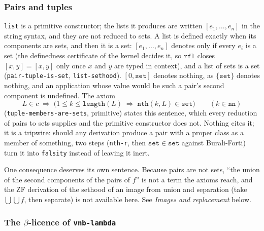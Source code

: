\subsubsection{Pairs and tuples}

\texttt{list} is a primitive constructor; the lists it produces are
written $[e_1, \ldots, e_n]$ in the string syntax, and they are not reduced
to sets.  A list is defined exactly when its components are sets, and
then it is a set: $[e_1, \ldots, e_n]$ denotes only if every $e_i$ is a
set (the definedness certificate of the kernel decides it, so $\texttt{rfl}$
closes $[x, y] = [x, y]$ only once $x$ and $y$ are typed in context), and a
list of sets is a set (\texttt{pair-tuple-is-set}, \texttt{list-sethood}).
$[0, \mathtt{set}]$ denotes nothing, as $\{\mathtt{set}\}$ denotes nothing,
and an application whose value would be such a pair's second component is
undefined.  The axiom
\[
  L \in c \;\Longrightarrow\; \bigl(1 \le k \le \texttt{length}(L)
  \;\Longrightarrow\; \texttt{nth}(k, L) \in \mathtt{set}\bigr)
  \qquad (k \in \mathtt{nn})
\]
(\texttt{tuple-members-are-sets}, primitive) states this
sentence, which every reduction of pairs to sets supplies and the primitive
constructor does not.  Nothing cites it; it is a tripwire: should any
derivation produce a pair with a proper class as a member of
something, two steps (\texttt{nth-r}, then $\mathtt{set} \in \mathtt{set}$
against Burali-Forti) turn it into \texttt{falsity} instead of leaving it inert.

One consequence deserves its own sentence.  Because pairs are not sets,
``the union of the second components of the pairs of $f$'' is not a term
the axioms reach, and the ZF derivation of the sethood of an image from
union and separation (take $\bigcup\bigcup f$, then separate) is not
available here.  See \emph{Images and replacement} below.

\subsubsection{The $\beta$-licence of \texttt{vnb-lambda}}

